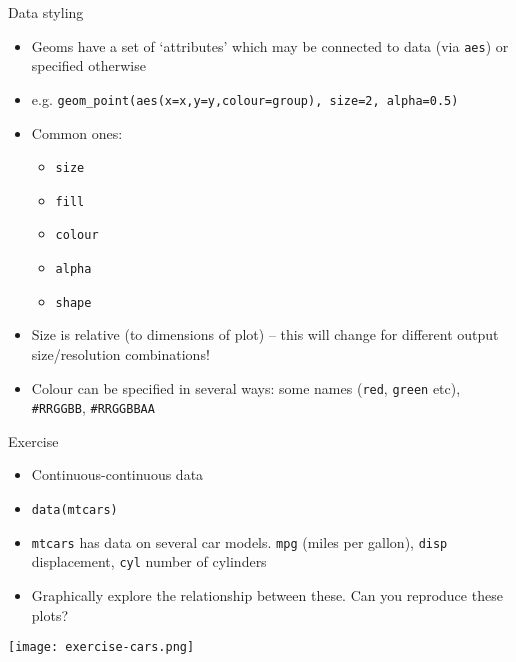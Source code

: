 \documentclass[10pt]{beamer}
\begin{document}
\begin{frame}{Data styling}
    \begin{itemize}
    \item Geoms have a set of `attributes' which may be connected to data (via \texttt{aes}) or specified otherwise
      \item[] e.g. \texttt{geom\_point(aes(x=x,y=y,colour=group), size=2, alpha=0.5)}
    \item Common ones:
      \begin{itemize}
      \item \texttt{size}
      \item \texttt{fill}
      \item \texttt{colour}
      \item \texttt{alpha}
      \item \texttt{shape}
      \end{itemize}
      \item Size is relative (to dimensions of plot) -- this will change for different output size/resolution combinations!
      \item Colour can be specified in several ways: some names (\texttt{red}, \texttt{green} etc), \texttt{\#RRGGBB}, \texttt{\#RRGGBBAA} 
    \end{itemize}
\end{frame}

\begin{frame}{Exercise}
  \begin{itemize}
  \item Continuous-continuous data
    \item[] \texttt{data(mtcars)}
    \item \texttt{mtcars} has data on several car models. \texttt{mpg} (miles per gallon), \texttt{disp} displacement, \texttt{cyl} number of cylinders
     \item Graphically explore the relationship between these. Can you reproduce these plots?
  \end{itemize}
  \texttt{[image: exercise-cars.png]}
\end{frame}
\end{document}
